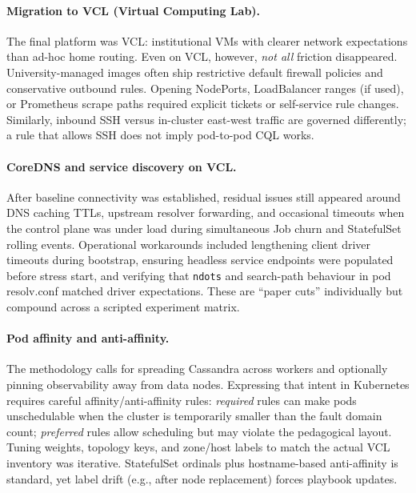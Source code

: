 \documentclass[11pt,a4paper]{article}
\begin{document}
\paragraph{Migration to VCL (Virtual Computing Lab).}
The final platform was VCL: institutional VMs with clearer network expectations than ad-hoc home routing. Even on VCL, however, \emph{not all} friction disappeared. University-managed images often ship restrictive default firewall policies and conservative outbound rules. Opening NodePorts, LoadBalancer ranges (if used), or Prometheus scrape paths required explicit tickets or self-service rule changes. Similarly, inbound SSH versus in-cluster east-west traffic are governed differently; a rule that allows SSH does not imply pod-to-pod CQL works.

\paragraph{CoreDNS and service discovery on VCL.}
After baseline connectivity was established, residual issues still appeared around DNS caching TTLs, upstream resolver forwarding, and occasional timeouts when the control plane was under load during simultaneous Job churn and StatefulSet rolling events. Operational workarounds included lengthening client driver timeouts during bootstrap, ensuring headless service endpoints were populated before stress start, and verifying that \texttt{ndots} and search-path behaviour in pod resolv.conf matched driver expectations. These are ``paper cuts'' individually but compound across a scripted experiment matrix.

\paragraph{Pod affinity and anti-affinity.}
The methodology calls for spreading Cassandra across workers and optionally pinning observability away from data nodes. Expressing that intent in Kubernetes requires careful affinity/anti-affinity rules: \emph{required} rules can make pods unschedulable when the cluster is temporarily smaller than the fault domain count; \emph{preferred} rules allow scheduling but may violate the pedagogical layout. Tuning weights, topology keys, and zone/host labels to match the actual VCL inventory was iterative. StatefulSet ordinals plus hostname-based anti-affinity is standard, yet label drift (e.g., after node replacement) forces playbook updates.
\end{document}
